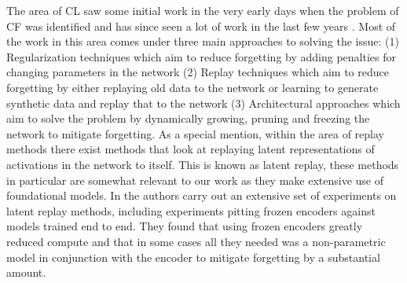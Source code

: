 The area of CL saw some initial work in the very early days when the problem of CF was identified \cite{ratcliff1990catastrophic,french1999catastrophic} and has since seen a lot of work in the last few years \cite{de2021continual,parisi2019continual}. Most of the work in this area comes under three main approaches to solving the issue: (1) Regularization techniques \cite{kirkpatrick2017reg,zenke2017reg} which aim to reduce forgetting by adding penalties for changing parameters in the network (2) Replay techniques \cite{shin2017replay,rolnick2019replay} which aim to reduce forgetting by either replaying old data to the network or learning to generate synthetic data and replay that to the network (3) Architectural approaches \cite{mallya2018paramiso,rusu2016progressive} which aim to solve the problem by dynamically growing, pruning and freezing the network to mitigate forgetting. As a special mention, within the area of replay methods there exist methods that look at replaying latent representations of activations in the network to itself. This is known as latent replay, these methods in particular are somewhat relevant to our work as they make extensive use of foundational models. In \cite{ostapenko2022continual} the authors carry out an extensive set of experiments on latent replay methods, including experiments pitting frozen encoders against models trained end to end. They found that using frozen encoders greatly reduced compute and that in some cases all they needed was a non-parametric model in conjunction with the encoder to mitigate forgetting by a substantial amount.